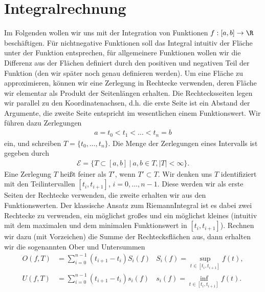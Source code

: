 \documentclass[letterpaper,10pt,english]{jupyterBook}
\begin{document}
\chapter{Integralrechnung}
\label{\detokenize{integration/integration:integralrechnung}}\label{\detokenize{integration/integration::doc}}
Im Folgenden wollen wir uns mit der Integration von Funktionen \(f:[a,b] \rightarrow \R\) beschäftigen. Für nichtnegative Funktionen soll das Integral intuitiv der Fläche unter der Funktion entsprechen, für allgemeinere Funktionen wollen wir die Differenz aus der Flächen definiert durch den positiven und negativen Teil der Funktion (den wir später noch genau definieren werden).  Um eine Fläche zu approximieren, können wir eine Zerlegung in Rechtecke verwenden, deren Fläche wir elementar als Produkt der Seitenlängen erhalten. Die Rechtecksseiten legen wir parallel zu den Koordinatenachsen, d.h. die erste Seite ist ein Abstand der Argumente, die zweite Seite entspricht im wesentlichen einem Funktionswert.
Wir führen dazu Zerlegungen
\begin{equation*}
\begin{split} a = t_0 < t_1 < \ldots < t_n = b\end{split}
\end{equation*}
ein, und schreiben \(T=\{t_0,\ldots,t_n\}\). Die Menge der Zerlegungen eines Intervalls ist gegeben durch
\begin{equation*}
\begin{split} {\mathcal E} = \{ T \subset [a,b]~|~ a,b \in T, \vert T \vert < \infty\}.\end{split}
\end{equation*}
Eine Zerlegung \(T\) heißt feiner als \(T'\), wenn \(T' \subset T\). Wir denken uns \(T\) identifiziert mit den Teilintervallen \([t_i,t_{i+1}]\), \(i=0,\ldots,n-1\). Diese werden wir als erste Seiten der Rechtecke verwenden, die zweite erhalten wir aus den Funktionswerten. Der klassische Ansatz zum Riemann\sphinxhyphen{}Integral ist es dabei zwei Rechtecke zu verwenden, ein möglichst großes und ein möglichst kleines (intuitiv mit dem maximalen und dem minimalen Funktionswert in \([t_i,t_{i+1}]\)). Rechnen wir dazu (mit Vorzeichen) die Summe der Rechtecksflächen aus, dann erhalten wir die sogenannten Ober\sphinxhyphen{} und Untersummen
\begin{align*}
O(f,T) &= \sum_{i=0}^{n-1} (t_{i+1} - t_i) S_i(f) &S_i(f) =  \sup_{t \in  [t_i,t_{i+1}]} f(t), \\
U(f,T) &= \sum_{i=0}^{n-1} (t_{i+1} - t_i) s_i(f) &s_i(f) =  \inf_{t \in  [t_i,t_{i+1}]} f(t).
\end{align*}
\end{document}
